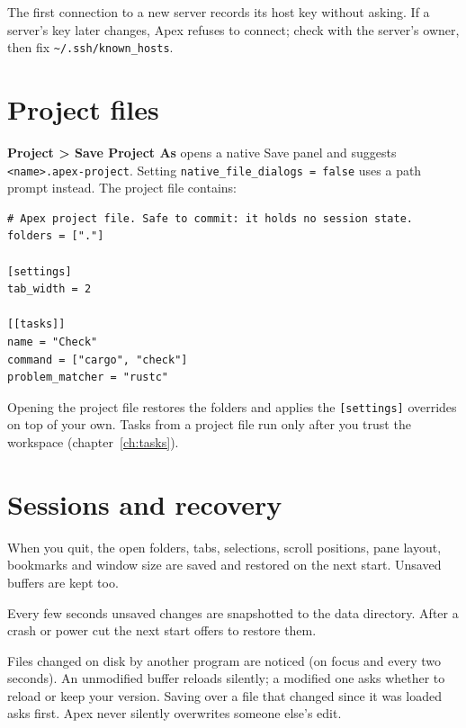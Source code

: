 \documentclass[11pt,a4paper,oneside]{report}
\newcommand{\menu}[1]{\textbf{#1}}
\newcommand{\setting}[1]{\texttt{#1}}
\begin{document}
\begin{watchout}
The first connection to a new server records its host key without asking.
If a server's key later changes, Apex refuses to connect; check with the
server's owner, then fix \texttt{\textasciitilde/.ssh/known\_hosts}.
\end{watchout}

\section{Project files}

\menu{Project > Save Project As} opens a native Save panel and suggests
\texttt{<name>.apex-project}. Setting
\setting{native\_file\_dialogs = false} uses a path prompt instead.
The project file contains:

\begin{Verbatim}
# Apex project file. Safe to commit: it holds no session state.
folders = ["."]

[settings]
tab_width = 2

[[tasks]]
name = "Check"
command = ["cargo", "check"]
problem_matcher = "rustc"
\end{Verbatim}

Opening the project file restores the folders and applies the
\texttt{[settings]} overrides on top of your own. Tasks from a project file
run only after you trust the workspace (chapter~\ref{ch:tasks}).

\section{Sessions and recovery}

When you quit, the open folders, tabs, selections, scroll positions, pane
layout, bookmarks and window size are saved and restored on the next start.
Unsaved buffers are kept too.

Every few seconds unsaved changes are snapshotted to the data directory.
After a crash or power cut the next start offers to restore them.

\begin{safenote}
Files changed on disk by another program are noticed (on focus and every
two seconds). An unmodified buffer reloads silently; a modified one asks
whether to reload or keep your version. Saving over a file that changed
since it was loaded asks first. Apex never silently overwrites someone
else's edit.
\end{safenote}

\end{document}
